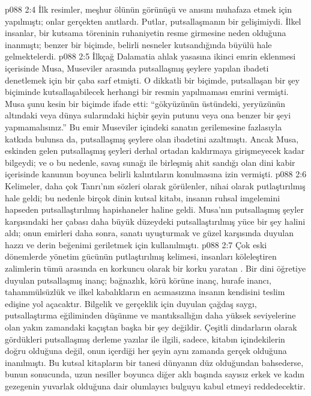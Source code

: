 \vs p088 2:4 İlk resimler, meşhur ölünün görünüşü ve anısını muhafaza etmek için yapılmıştı; onlar gerçekten anıtlardı. Putlar, putsallaşmanın bir gelişimiydi. İlkel insanlar, bir kutsama töreninin ruhaniyetin resme girmesine neden olduğuna inanmıştı; benzer bir biçimde, belirli nesneler kutsandığında büyülü hale gelmektelerdi.
\vs p088 2:5 İlkçağ Dalamatia ahlak yasasına ikinci emrin eklenmesi içerisinde Musa, Museviler arasında putsallaşmış şeylere yapılan ibadeti denetlemek için bir çaba sarf etmişti. O dikkatli bir biçimde, putsallaşan bir şey biçiminde kutsallaşabilecek herhangi bir resmin yapılmaması emrini vermişti. Musa şunu kesin bir biçimde ifade etti: “gökyüzünün üstündeki, yeryüzünün altındaki veya dünya sularındaki hiçbir şeyin putunu veya ona benzer bir şeyi yapmamalısınız.” Bu emir Museviler içindeki sanatın gerilemesine fazlasıyla katkıda bulunsa da, putsallaşmış şeylere olan ibadetini azaltmıştı. Ancak Musa, eskinden gelen putsallaşmış şeyleri derhal ortadan kaldırmaya girişmeyecek kadar bilgeydi; ve o bu nedenle, savaş sunağı ile birleşmiş ahit sandığı olan dini kabir içerisinde kanunun boyunca belirli kalıntıların konulmasına izin vermişti.
\vs p088 2:6 Kelimeler, daha çok Tanrı’nın sözleri olarak görülenler, nihai olarak putlaştırılmış hale geldi; bu nedenle birçok dinin kutsal kitabı, insanın ruhsal imgelemini hapseden putsallaştırılmış hapishaneler haline geldi. Musa'nın putsallaşmış şeyler karşısındaki her çabası daha büyük düzeydeki putsallaştırılmış yüce bir şey halini aldı; onun emirleri daha sonra, sanatı uyuşturmak ve güzel karşısında duyulan hazzı ve derin beğenimi geriletmek için kullanılmıştı.
\vs p088 2:7 Çok eski dönemlerde yönetim gücünün putlaştırılmış kelimesi, insanları köleleştiren zalimlerin tümü arasında en korkuncu olarak bir korku yaratan . Bir dini öğretiye duyulan putsallaşmış inanç; bağnazlık, körü körüne inanç, hurafe inancı, tahammülsüzlük ve ilkel kabalıkların en acımasızına insanın kendisini teslim edişine yol açacaktır. Bilgelik ve gerçeklik için duyulan çağdaş saygı, putsallaştırma eğiliminden düşünme ve mantıksallığın daha yüksek seviyelerine olan yakın zamandaki kaçıştan başka bir şey değildir. Çeşitli dindarların  olarak gördükleri putsallaşmış derleme yazılar ile ilgili, sadece, kitabın içindekilerin doğru olduğuna değil, onun içerdiği her şeyin aynı zamanda gerçek olduğuna inanılmıştı. Bu kutsal kitapların bir tanesi dünyanın düz olduğundan bahsederse, bunun sonucunda, uzun nesiller boyunca diğer aklı başında sayısız erkek ve kadın gezegenin yuvarlak olduğuna dair olumlayıcı bulguyu kabul etmeyi reddedecektir.
